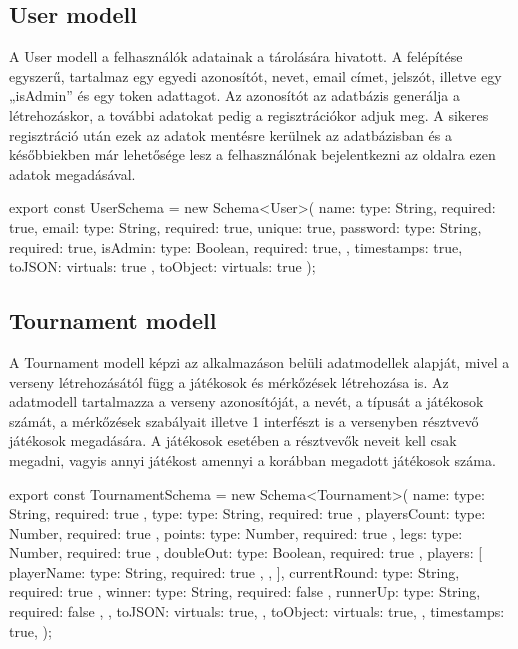 \subsection{User modell}
A User modell a felhasználók adatainak a tárolására hivatott. A felépítése egyszerű, tartalmaz egy egyedi azonosítót, nevet, email címet, jelszót, illetve egy „isAdmin” és egy token adattagot. Az azonosítót az adatbázis generálja a létrehozáskor, a további adatokat pedig a regisztrációkor adjuk meg. A sikeres regisztráció után ezek az adatok mentésre kerülnek az adatbázisban és a későbbiekben már lehetősége lesz a felhasználónak bejelentkezni az oldalra ezen adatok megadásával.

\begin{cpp}
export const UserSchema = new Schema<User>({
    name: {type: String, required: true},
    email: {type: String, required: true, unique: true},
    password: {type: String, required: true},
    isAdmin: {type: Boolean, required: true},
}, {
    timestamps: true,
    toJSON:{
        virtuals: true
    },
    toObject:{
        virtuals: true
    }
});
\end{cpp}

\subsection{Tournament modell}
A Tournament modell képzi az alkalmazáson belüli adatmodellek alapját, mivel a verseny létrehozásától függ a játékosok és mérkőzések létrehozása is. Az adatmodell tartalmazza a verseny azonosítóját, a nevét, a típusát a játékosok számát, a mérkőzések szabályait illetve 1 interfészt is a versenyben résztvevő játékosok megadására. A játékosok esetében a résztvevők neveit kell csak megadni, vagyis annyi játékost amennyi a korábban megadott játékosok száma.

\begin{cpp}
export const TournamentSchema = new Schema<Tournament>(
  {
    name: { type: String, required: true },
    type: { type: String, required: true },
    playersCount: { type: Number, required: true },
    points: { type: Number, required: true },
    legs: { type: Number, required: true },
    doubleOut: { type: Boolean, required: true },
    players: [
      {
        playerName: { type: String, required: true },
      },
    ],
    currentRound: { type: String, required: true },
    winner: { type: String, required: false },
    runnerUp: { type: String, required: false },
  },
  {
    toJSON: {
      virtuals: true,
    },
    toObject: {
      virtuals: true,
    },
    timestamps: true,
  }
);
\end{cpp}

